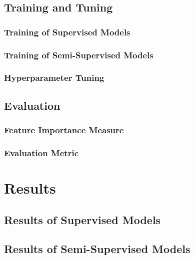 \subsection{Training and Tuning}\label{training-and-tuning}

\subsubsection{Training of Supervised
Models}\label{training-of-supervised-models}


\subsubsection{Training of Semi-Supervised
Models}\label{training-of-semi-supervised-models}


\subsubsection{Hyperparameter Tuning}\label{hyperparameter-tuning}


\subsection{Evaluation}\label{evaluation}

\subsubsection{Feature Importance
Measure}\label{feature-importance-measure}

\subsubsection{Evaluation Metric}\label{evaluation-metric}

\newpage
\section{Results}\label{results}

\subsection{Results of Supervised
Models}\label{results-of-supervised-models}

\subsection{Results of Semi-Supervised
Models}\label{results-of-semi-supervised-models}

